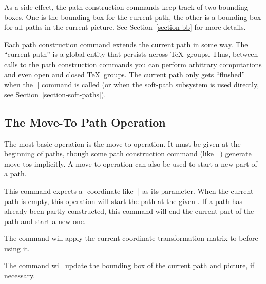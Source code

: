 As a side-effect, the path construction commands keep track of two
bounding boxes. One is the bounding box for the current path, the
other is a bounding box for all paths in the current picture. See
Section~\ref{section-bb} for more details.

Each path construction command extends the current path in some
way. The ``current path'' is a global entity that persists across
\TeX\ groups. Thus, between calls to the path construction commands
you can perform arbitrary computations and even open and closed \TeX\
groups. The current path only gets ``flushed'' when the |\pgfusepath|
command is called (or when the soft-path subsystem is used directly,
see Section~\ref{section-soft-paths}).

\subsection{The Move-To Path Operation}

The most basic operation is the move-to operation. It must be given at
the beginning of paths, though some path construction command (like
|\pgfpathrectangle|) generate move-tos implicitly. A move-to operation
can also be used to start a new part of a path.

\begin{command}{\pgfpathmoveto{}}
  This command expects a \pgfname-coordinate like |\pgfpointorigin| as
  its parameter. When the current path is empty, this operation will
  start the path at the given \meta{coordinate}. If a path has already
  been partly constructed, this command will end the current part of
  the path and start a new one.
\begin{codeexample}[]
\begin{pgfpicture}
  \pgfpathmoveto{\pgfpointorigin}
  \pgfpathlineto{\pgfpoint{1cm}{1cm}}
  \pgfpathlineto{\pgfpoint{2cm}{1cm}}
  \pgfpathlineto{\pgfpoint{3cm}{0.5cm}}
  \pgfpathlineto{\pgfpoint{3cm}{0cm}}
\end{pgfpicture}
\end{codeexample}
\begin{codeexample}[]
\begin{pgfpicture}
  \pgfpathmoveto{\pgfpointorigin}
  \pgfpathlineto{\pgfpoint{1cm}{1cm}}
  \pgfpathlineto{\pgfpoint{2cm}{1cm}}
  \pgfpathmoveto{\pgfpoint{2cm}{1cm}} %
  \pgfpathlineto{\pgfpoint{3cm}{0.5cm}}
  \pgfpathlineto{\pgfpoint{3cm}{0cm}}
\end{pgfpicture}
\end{codeexample}
  The command will apply the current coordinate transformation matrix
  to \meta{coordinate} before using it.

  The command will update the bounding box of the current path and
  picture, if necessary.
\end{command}


